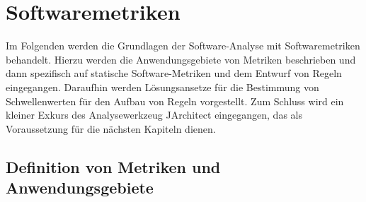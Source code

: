 \documentclass[12pt]{article}
\begin{document}
\section{Softwaremetriken}\label{metriken}

Im Folgenden werden die Grundlagen der Software-Analyse mit
Softwaremetriken behandelt. Hierzu werden die Anwendungsgebiete
von Metriken beschrieben und dann spezifisch auf statische
Software-Metriken und dem Entwurf von Regeln eingegangen.
Daraufhin werden Lösungsansetze für die Bestimmung von
Schwellenwerten für den Aufbau von Regeln vorgestellt. Zum Schluss
wird ein kleiner Exkurs des Analysewerkzeug JArchitect
eingegangen, das als Voraussetzung für die nächsten Kapiteln
dienen.

\subsection{Definition von Metriken und Anwendungsgebiete}
\end{document}
